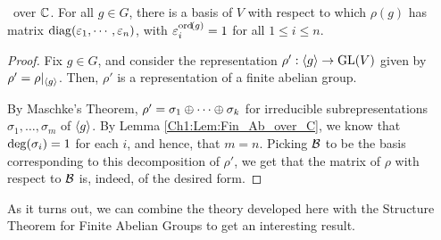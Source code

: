 \begin{proposition}\label{Ch1:Prop:Diag_Roots_of_Ord}
    \ over $\mathbb{C}$. For all $g \in G$, there is a basis of $V$ with respect to which $\rho(g)$ has matrix $\operatorname{diag}\!\left( \varepsilon_1, \cdots, \varepsilon_n \right)$, with $\varepsilon_i^{\operatorname{ord}\!\left( g \right)} = 1$ for all $1 \leq i \leq n$.
\end{proposition}
\begin{proof}
    Fix $g \in G$, and consider the representation $\rho' : \left\langle g \right\rangle \to \operatorname{GL}\!\left( V \right)$ given by $\rho' = \rho\vert_{\left\langle g \right\rangle}$. Then, $\rho'$ is a representation of a finite abelian group.

    By Maschke's Theorem, $\rho' = \sigma_1 \oplus \cdots \oplus \sigma_k$ for irreducible subrepresentations $\sigma_1, \ldots, \sigma_m$ of $\left\langle g \right\rangle$. By Lemma \ref{Ch1:Lem:Fin_Ab_over_C}, we know that $\deg\!\left( \sigma_i \right) = 1$ for each $i$, and hence, that $m = n$. Picking $\mathcal{B}$ to be the basis corresponding to this decomposition of $\rho'$, we get that the matrix of $\rho$ with respect to $\mathcal{B}$ is, indeed, of the desired form.
\end{proof}

As it turns out, we can combine the theory developed here with the Structure Theorem for Finite Abelian Groups to get an interesting result.

